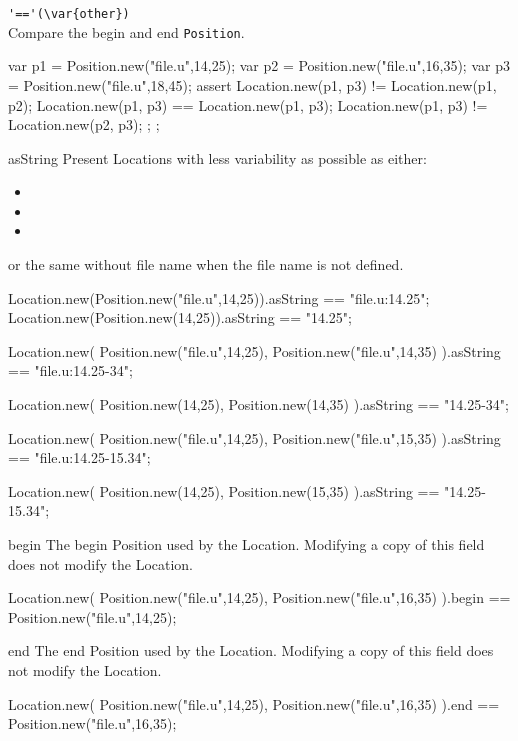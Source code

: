 \begin{urbiscriptapi}

\item \lstinline|'=='(\var{other})|\\
  Compare the begin and end \lstinline|Position|.
\begin{urbiscript}
{
  var p1 = Position.new("file.u",14,25);
  var p2 = Position.new("file.u",16,35);
  var p3 = Position.new("file.u",18,45);
  assert {
    Location.new(p1, p3) != Location.new(p1, p2);
    Location.new(p1, p3) == Location.new(p1, p3);
    Location.new(p1, p3) != Location.new(p2, p3);
  };
};
\end{urbiscript}

\item[asString]
  Present Locations with less variability as possible as either:
  \begin{itemize}
  \item {}
  \item {}
  \item {}
  \end{itemize}
  or the same without file name when the file name is not defined.
\begin{urbiassert}
Location.new(Position.new("file.u",14,25)).asString == "file.u:14.25";
Location.new(Position.new(14,25)).asString == "14.25";

Location.new(
  Position.new("file.u",14,25),
  Position.new("file.u",14,35)
).asString == "file.u:14.25-34";

Location.new(
  Position.new(14,25),
  Position.new(14,35)
).asString == "14.25-34";

Location.new(
  Position.new("file.u",14,25),
  Position.new("file.u",15,35)
).asString == "file.u:14.25-15.34";

Location.new(
  Position.new(14,25),
  Position.new(15,35)
).asString == "14.25-15.34";
\end{urbiassert}

\item[begin]
  The begin Position used by the Location.  Modifying a copy of this field
  does not modify the Location.
\begin{urbiassert}
Location.new(
  Position.new("file.u",14,25),
  Position.new("file.u",16,35)
).begin == Position.new("file.u",14,25);
\end{urbiassert}

\item[end]
  The end Position used by the Location.  Modifying a copy of this field
  does not modify the Location.
\begin{urbiassert}
Location.new(
  Position.new("file.u",14,25),
  Position.new("file.u",16,35)
).end == Position.new("file.u",16,35);
\end{urbiassert}


\end{urbiscriptapi}

